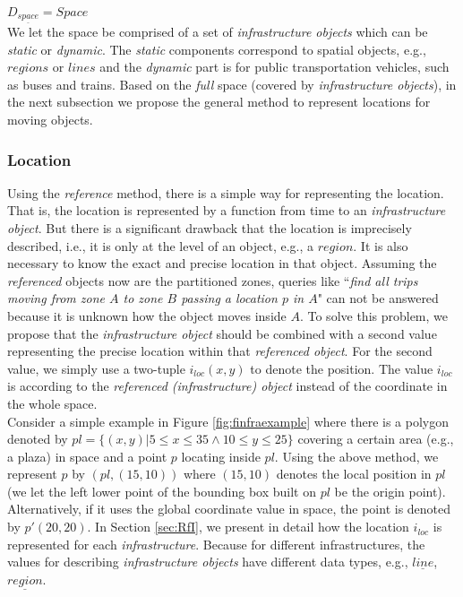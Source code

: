 $D_{\underline{space}}= Space$ \\

We let the space be comprised of a set of \textit{infrastructure objects} which can be 
\textit{static} or \textit{dynamic}. 
The \textit{static} components correspond to spatial objects, e.g., $regions$ or $lines$ and the 
\textit{dynamic} part is for public transportation vehicles, such as buses and trains. Based on
the \textit{full} space (covered by \textit{infrastructure objects}), in the next subsection 
we propose the general method to represent locations for moving objects. 

\subsubsection{Location}
\label{sec:location}

Using the \textit{reference} method, there is a simple way for representing the location. 
That is, the location is represented by a function from time to an 
\textit{infrastructure object}. But there is a significant drawback that the location is 
imprecisely described, i.e., it is only 
at the level of an object, e.g., a $region$. It is also necessary to know the exact and precise location in that object. Assuming the \textit{referenced} objects now are the partitioned zones, 
queries like ``\textit{find all trips moving from zone $A$ to zone $B$ passing a 
location $p$ in $A$}" can not be answered because it is unknown how the object moves 
inside $A$. To solve this problem, we propose that 
the \textit{infrastructure object} should be combined with a second value 
representing the precise location within that \textit{referenced object}. 
For the second value, we simply use a two-tuple $i_{loc}(x,y)$ to denote the position.
The value $i_{loc}$ is according to the \textit{referenced (infrastructure) object} instead of the coordinate in the whole space. \\

Consider a simple example in Figure \ref{fig:finfraexample} where there is 
a polygon denoted by $pl=\{(x,y)|5\leq x\leq35 \wedge 10 \leq y \leq 25\}$ covering a 
certain area (e.g., a plaza) in space and a point $p$ locating inside $pl$. 
Using the above method, we represent $p$ by $(pl,(15,10))$ where 
$(15,10)$ denotes the local position in $pl$ (we let the left lower point 
of the bounding box built on $pl$ be the origin point). Alternatively, if it uses 
the global coordinate value in space, the point is denoted by $p'(20,20)$. 
In Section \ref{sec:RfI}, we present in detail how the location $i_{loc}$ 
is represented for each \textit{infrastructure}. Because for different infrastructures, the values for describing \textit{infrastructure objects} have different data types, e.g., $\underline{line}$, 
$\underline{region}$. \\

